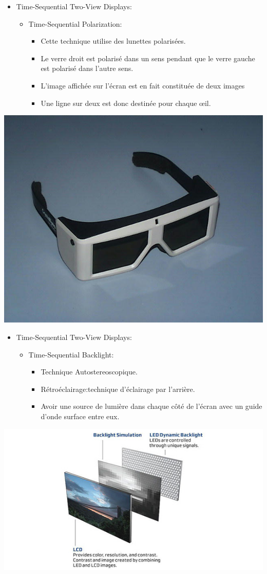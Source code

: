 	
	\begin{frame}		  	
	  \begin{itemize}
	  	\item Time-Sequential Two-View Displays:
        \begin{itemize}
				\item Time-Sequential Polarization:
		\begin{itemize}
		    \item Cette technique utilise des lunettes polarisées.
		    \item Le verre droit est polarisé dans un sens pendant que le verre gauche est polarisé dans l’autre    sens.
   		    \item L’image affichée sur l’écran est en fait constituée de deux images
		    \item Une ligne sur deux est donc destinée pour chaque œil.
		\end{itemize}
		\end{itemize}
\end{itemize}
\includegraphics[keepaspectratio,height=.2\linewidth]{2.jpg}
	\end{frame}

\begin{frame}
	  \begin{itemize}
	  	\item Time-Sequential Two-View Displays:
\begin{itemize}
				\item Time-Sequential Backlight:
		\begin{itemize}
		    \item Technique Autostereoscopique.
		    \item Rétroéclairage:technique d'éclairage par l'arrière.
   		    \item Avoir une source de lumière dans chaque côté de l'écran avec un guide d'onde surface entre eux.

		\end{itemize}
		\end{itemize}
\end{itemize}
\includegraphics[keepaspectratio,height=.2\linewidth]{3.jpg}
	\end{frame}
	
